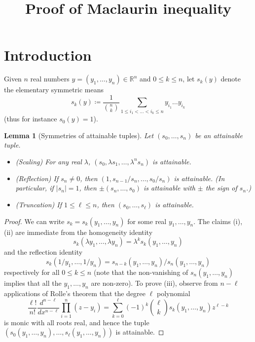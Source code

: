\documentclass[12pt,a4paper,reqno]{amsart}
\numberwithin{equation}{section}
\theoremstyle{plain}
\newtheorem{lemma}[theorem]{Lemma}
\theoremstyle{definition}
\newcommand\R{\mathbb{R}}
\begin{document}
\title{Proof of Maclaurin inequality}

\author{} %
\address{}%
\email{}%



\maketitle


\section{Introduction}

Given $n$ real numbers $y = (y_1,\dots,y_n) \in \R^n$ and $0 \leq k \leq n$, let $s_k(y)$ denote the elementary symmetric means
$$ s_k(y) \coloneqq \frac{1}{\binom{n}{k}} \sum_{1 \leq i_1 < \dots < i_k \leq n} y_{i_1} \dots y_{i_k}$$
(thus for instance $s_0(y)=1$).  

\begin{lemma}[Symmetries of attainable tuples]\label{syms}  Let $(s_0,\dots,s_n)$ be an attainable tuple.
    \begin{itemize}
        \item[(i)] (Scaling)  For any real $\lambda$, $(s_0, \lambda s_1, \dots, \lambda^n s_n)$ is attainable.
        \item[(ii)] (Reflection)  If $s_n \neq 0$, then $(1, s_{n-1}/s_n, \dots, s_0/s_n)$ is attainable. (In particular, if $|s_n|=1$, then $\pm (s_n,\dots,s_0)$ is attainable with $\pm$ the sign of $s_n$.)
        \item[(iii)] (Truncation) If $1 \leq \ell \leq n$, then $(s_0,\dots,s_\ell)$ is attainable.
    \end{itemize}
    \end{lemma}

    \begin{proof}  We can write $s_k = s_k(y_1,\dots,y_n)$ for some real $y_1,\dots,y_n$. The claims (i), (ii) are immediate from the homogeneity identity
        $$ s_k(\lambda y_1,\dots,\lambda y_n) = \lambda^k s_k(y_1,\dots,y_n)$$
        and the reflection identity
    $$ s_k(1/y_1,\dots,1/y_n) = s_{n-k}(y_1,\dots,y_n) / s_n(y_1,\dots,y_n)$$
    respectively for all $0 \leq k \leq n$ (note that the non-vanishing of $s_n(y_1,\dots,y_n)$ implies that all the $y_1,\dots,y_n$ are non-zero).  To prove (iii), observe from $n-\ell$ applications of Rolle's theorem that the degree $\ell$ polynomial
    $$ \frac{\ell!}{n!} \frac{d^{n-\ell}}{dx^{n-\ell}} \prod_{i=1}^n (z-y_i) = \sum_{k=0}^\ell (-1)^k \binom{\ell}{k} s_k(y_1,\dots,y_n) z^{\ell-k}$$
    is monic with all roots real, and hence the tuple $(s_0(y_1,\dots,y_n),\dots,s_\ell(y_1,\dots,y_n))$ is attainable.
\end{proof}
\end{document}
